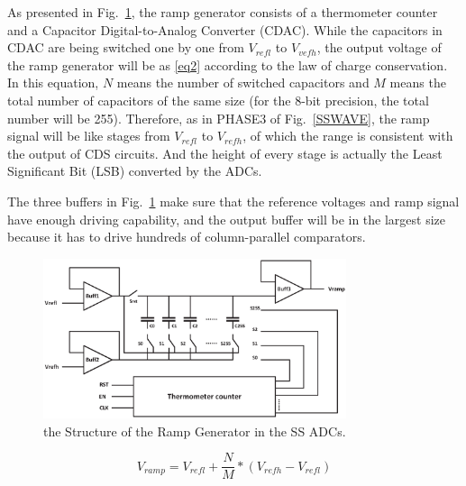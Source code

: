 \documentclass[conference]{IEEEtran}
\begin{document}
As presented in Fig.~\ref{RAMP}, the ramp generator consists of a thermometer counter and a Capacitor Digital-to-Analog Converter (CDAC). While the capacitors in CDAC are being switched one by one from $V_{refl}$ to $V_{vefh}$, the output voltage of the ramp generator will be as \eqref{eq2} according to the law of charge conservation. In this equation, $N$ means the number of switched capacitors and $M$ means the total number of capacitors of the same size (for the 8-bit precision, the total number will be 255). Therefore, as in PHASE3 of Fig.~\ref{SSWAVE}, the ramp signal will be like stages from $V_{refl}$ to $V_{refh}$, of which the range is consistent with the output of CDS circuits. And the height of every stage is actually the Least Significant Bit (LSB) converted by the ADCs.
 
The three buffers in Fig.~\ref{RAMP} make sure that the reference voltages and ramp signal have enough driving capability, and the output buffer will be in the largest size because it has to drive hundreds of column-parallel comparators.
\begin{figure}[htbp]
	\centerline{\includegraphics[width=3.5in]{./Figures/RAMP.eps}}
	\caption{the Structure of the Ramp Generator in the SS ADCs.}
	\label{RAMP}
\end{figure} 
\begin{equation}
	V_{ramp}=V_{refl}+\frac{N}{M}\ast\left(V_{refh}-V_{refl}\right)
		\label{eq2}
\end{equation}
\end{document}
